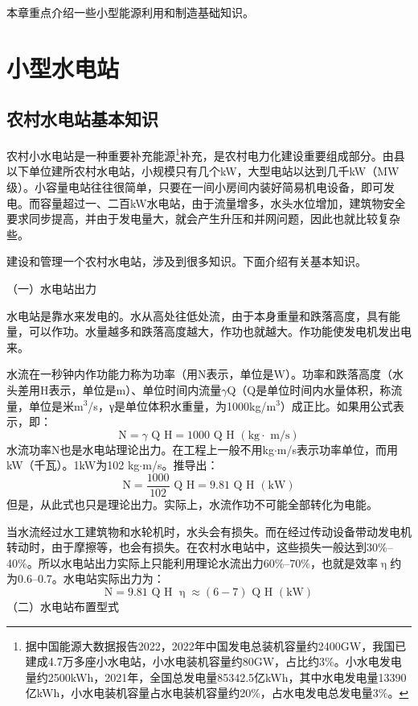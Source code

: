\documentclass{ctexbook}
\begin{document}
本章重点介绍一些小型能源利用和制造基础知识。
\section{小型水电站}
\subsection{农村水电站基本知识}
农村小水电站是一种重要补充能源\footnote{据中国能源大数据报告2022，2022年中国发电总装机容量约2400GW，我国已建成4.7万多座小水电站，小水电装机容量约80GW，占比约3\%。小水电发电量约2500kWh，2021年，全国总发电量85342.5亿kWh，其中水电发电量13390亿kWh，小水电装机容量占水电装机容量约20\%，占水电发电总发电量3\%。}补充，是农村电力化建设重要组成部分。由县以下单位建所农村水电站，小规模只有几个kW，大型电站以达到几千kW（MW级）。小容量电站往往很简单，只要在一间小房间内装好简易机电设备，即可发电。而容量超过一、二百kW水电站，由于流量增多，水头水位增加，建筑物安全要求同步提高，并由于发电量大，就会产生升压和并网问题，因此也就比较复杂些。

建设和管理一个农村水电站，涉及到很多知识。下面介绍有关基本知识。

（一）水电站出力

水电站是靠水来发电的。水从高处往低处流，由于本身重量和跌落高度，具有能量，可以作功。水量越多和跌落高度越大，作功也就越大。作功能使发电机发出电来。

水流在一秒钟内作功能力称为功率（用N表示，单位是W）。功率和跌落高度（水头差用H表示，单位是m）、单位时间内流量$\gamma$Q（Q是单位时间内水量体积，称流量，单位是米m$^3$/s，γ是单位体积水重量，为1000kg/m$^3$）成正比。如果用公式表示，即：
\begin{equation*}
\text{N}=\gamma \text{ Q H}=1000\text{ Q H }( \text{kg$\cdot$ m/s} )
\end{equation*}
水流功率N也是水电站理论出力。在工程上一般不用kg$\cdot$m/s表示功率单位，而用kW（千瓦）。1kW为102 kg$\cdot$m/s。推导出：
\begin{equation*}
\text{N}=\frac{1000}{102}\text{ Q H}=9.81 \text{ Q H } (\text{kW})
\end{equation*}
但是，从此式也只是理论出力。实际上，水流作功不可能全部转化为电能。

当水流经过水工建筑物和水轮机时，水头会有损失。而在经过传动设备带动发电机转动时，由于摩擦等，也会有损失。在农村水电站中，这些损失一般达到30\%--40\%。所以水电站出力实际上只能利用理论水流出力60\%--70\%，也就是效率$\upeta$约为0.6--0.7。水电站实际出力为：
\begin{equation*}
\text{N}=9.81\text{ Q H }\upeta \approx (6-7)\text{ Q H } (\text{kW})
\end{equation*}
（二）水电站布置型式
\end{document}
